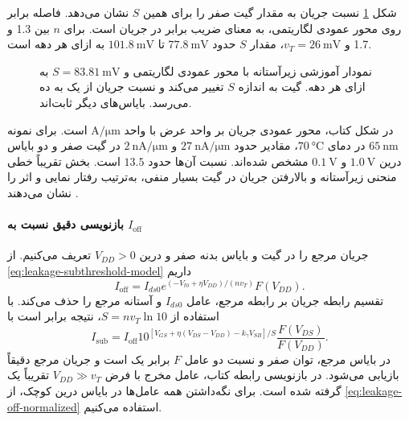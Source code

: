 شکل \ref{fig:leakage-semilog} نسبت جریان به مقدار گیت صفر را برای
همین \(S\) نشان می‌دهد. فاصله برابر روی محور عمودی لگاریتمی، به معنای
ضریب برابر در جریان است. برای \(n\) بین \num{1.3} و \num{1.7} و
\(v_T=\qty{26}{\milli\volt}\)، مقدار \(S\) حدود
\(\qty{77.8}{\milli\volt}\) تا \(\qty{101.8}{\milli\volt}\) به ازای هر دهه است.
\begin{figure}[!htbp]
\centering
\begin{latin}
\PersianMathDigits
{}
\end{latin}
\caption{نمودار آموزشی زیرآستانه با محور عمودی لگاریتمی و
\(S=\qty{83.81}{\milli\volt}\) به ازای هر دهه. گیت به اندازه \(S\)
تغییر می‌کند و نسبت جریان از یک به ده می‌رسد. بایاس‌های دیگر ثابت‌اند.}
\label{fig:leakage-semilog}
\end{figure}

در شکل  کتاب، محور عمودی جریان بر واحد عرض با واحد
\(\unit{\ampere\per\micro\metre}\) است. برای نمونه
\(\qty{65}{\nano\metre}\) در دمای \(\qty{70}{\degreeCelsius}\)،
مقادیر حدود \(\qty{27}{\nano\ampere\per\micro\metre}\) و
\(\qty{2}{\nano\ampere\per\micro\metre}\) در گیت صفر و دو بایاس
درین \(\qty{1.0}{\volt}\) و \(\qty{0.1}{\volt}\) مشخص شده‌اند.
نسبت آن‌ها حدود \(13.5\) است. بخش تقریباً خطی منحنی زیرآستانه و
بالارفتن جریان در گیت بسیار منفی، به‌ترتیب رفتار نمایی و اثر
 را نشان می‌دهند \cite[صفحه ۸۱]{weste}.

\paragraph*{بازنویسی دقیق نسبت به \(I_{\mathrm{off}}\)}
جریان مرجع را در گیت و بایاس بدنه صفر و درین \(V_{DD}>0\) تعریف
می‌کنیم. از \eqref{eq:leakage-subthreshold-model} داریم
\begin{equation}
 I_{\mathrm{off}}=I_{ds0}
 e^{(-V_{t0}+\eta V_{DD})/(nv_T)}F(V_{DD}).
 \label{eq:leakage-off-definition}
\end{equation}
تقسیم رابطه جریان بر رابطه مرجع، عامل \(I_{ds0}\) و آستانه مرجع را
حذف می‌کند. با استفاده از \(S=nv_T\ln10\)، نتیجه برابر است با
\begin{equation}
 \boxed{I_{\mathrm{sub}}=I_{\mathrm{off}}
 10^{[V_{GS}+\eta(V_{DS}-V_{DD})-k_\gamma V_{SB}]/S}
 \frac{F(V_{DS})}{F(V_{DD})}}.
 \label{eq:leakage-off-normalized}
\end{equation}
در بایاس مرجع، توان صفر و نسبت دو عامل \(F\) برابر یک است و جریان
مرجع دقیقاً بازیابی می‌شود. در بازنویسی رابطه  کتاب،
عامل مخرج با فرض \(V_{DD}\gg v_T\) تقریباً یک گرفته شده است.
برای نگه‌داشتن همه عامل‌ها در بایاس درین کوچک، از
\eqref{eq:leakage-off-normalized} استفاده می‌کنیم.

